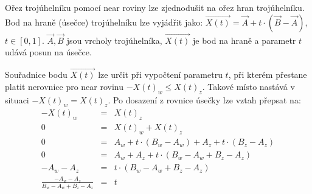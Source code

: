  Ořez trojúhelníku pomocí near roviny lze zjednodušit na ořez hran trojúhelníku. Bod na hraně (úsečce) trojúhelníku lze vyjádřit jako\+: $ \overrightarrow{X(t)} = \overrightarrow{A} + t \cdot (\overrightarrow{B}-\overrightarrow{A}) $, $t \in [0,1] $. $ \overrightarrow{A}, \overrightarrow{B} $ jsou vrcholy trojúhelníka, $ \overrightarrow{X(t)} $ je bod na hraně a parametr $ t $ udává posun na úsečce.

 Souřadnice bodu $ \overrightarrow{X(t)} $ lze určit při vypočtení parametru $ t $, při kterém přestane platit nerovnice pro near rovinu $ -X(t)_w \leq X(t)_z $. Takové místo nastává v situaci $ -X(t)_w = X(t)_z $. Po dosazení z rovnice úsečky lze vztah přepsat na\+: \begin{eqnarray*} -X(t)_w &=& X(t)_z \\ 0 &=& X(t)_w + X(t)_z \\ 0 &=& A_w + t \cdot (B_w-A_w) + A_z + t \cdot (B_z - A_z) \\ 0 &=& A_w + A_z + t \cdot (B_w-A_w+B_z-A_z) \\ -A_w-A_z &=& t \cdot (B_w-A_w+B_z-A_z) \\ \frac{-A_w - A_z}{B_w-A_w+B_z-A_z} &=& t\\ \end{eqnarray*}

